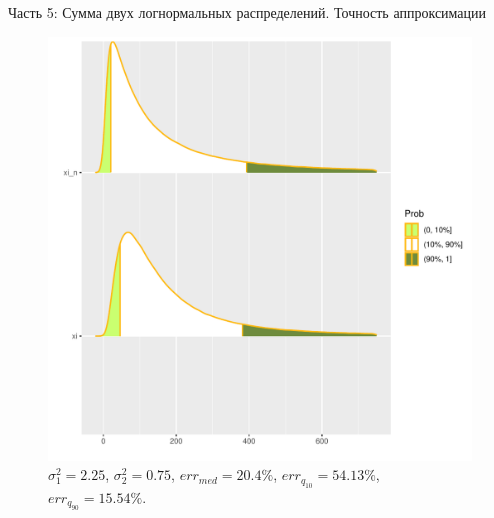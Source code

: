 \documentclass[ucs, notheorems, handout]{beamer}
\begin{document}
	\begin{frame}{Часть 5: Сумма двух логнормальных распределений. Точность аппроксимации }
		
		\begin{figure}[h]
			\begin{center}
				\begin{minipage}[h]{0.53\linewidth}
					\includegraphics[width=1\linewidth]{img/sr2.pdf}
					\caption{$\sigma_{1}^{2} = 2.25$, $\sigma_{2}^{2} = 0.75$, $err_{med} = 20.4\%$,  $err_{q_{10}} = 54.13\%$,  $err_{q_{90}} = 15.54\%$. } %
					\label{ris7} %
				\end{minipage}
				
			\end{center}
		\end{figure}
		
	\end{frame}
	
\end{document}
